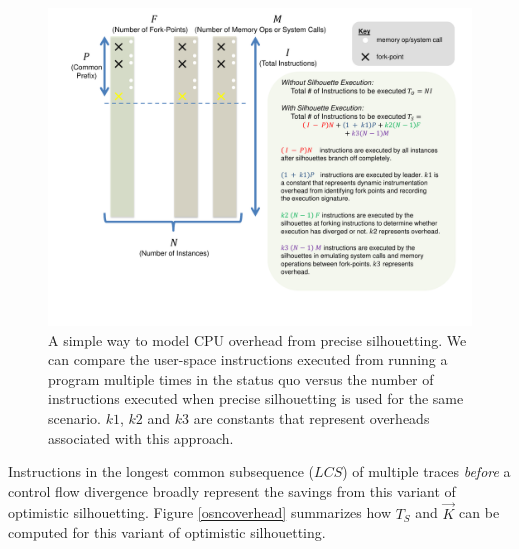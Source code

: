 \begin{figure}
  \centering
  \includegraphics[scale=0.75, trim=3cm 0cm 1cm 0cm]{calc.pdf}
  \caption[Modeling CPU overhead from precise silhouetting]%
          {A simple way to model CPU overhead from precise silhouetting.
            We can compare the user-space instructions executed from running
            a program multiple times in the status quo
            versus the number of instructions executed
            when precise silhouetting is used for
            the same scenario. $k1$, $k2$ and $k3$ 
            are constants that represent overheads
            associated with this approach.}
  \label{psoverhead}
\end{figure}

 \newline 
Instructions in the longest common subsequence ($LCS$)
of multiple traces {\em before} a control flow
divergence broadly represent the savings from 
this variant of optimistic silhouetting.
Figure \ref{osncoverhead} summarizes how $T_{S}$ and $\vec K$ can be computed
for this variant of optimistic silhouetting. \newline

